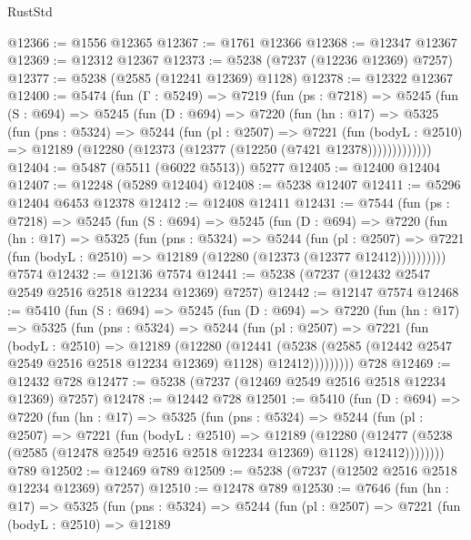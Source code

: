 \begin{lexlean}{RustStd}
\begin{coremodule}
@12366 := @1556 @12365
@12367 := @1761 @12366
@12368 := @12347 @12367
@12369 := @12312 @12367
@12373 := @5238 (@7237 (@12236 @12369) @7257)
@12377 := @5238 (@2585 (@12241 @12369) @1128)
@12378 := @12322 @12367
@12400 := @5474
    (fun (Γ : @5249) =>
    @7219
      (fun (ps : @7218) =>
      @5245
        (fun (S : @694) =>
        @5245
          (fun (D : @694) =>
          @7220
            (fun (hn : @17) =>
            @5325
              (fun (pns : @5324) =>
              @5244
                (fun (pl : @2507) =>
                @7221
                  (fun (bodyL : @2510) =>
                  @12189 (@12280 (@12373 (@12377 (@12250 (@7421 @12378)))))))))))))
@12404 := @5487 (@5511 (@6022 @5513)) @5277
@12405 := @12400 @12404
@12407 := @12248 (@5289 @12404)
@12408 := @5238 @12407
@12411 := @5296 @12404 @6453 @12378
@12412 := @12408 @12411
@12431 := @7544
    (fun (ps : @7218) =>
    @5245
      (fun (S : @694) =>
      @5245
        (fun (D : @694) =>
        @7220
          (fun (hn : @17) =>
          @5325
            (fun (pns : @5324) =>
            @5244
              (fun (pl : @2507) =>
              @7221 (fun (bodyL : @2510) => @12189 (@12280 (@12373 (@12377 @12412))))))))))
    @7574
@12432 := @12136 @7574
@12441 := @5238 (@7237 (@12432 @2547 @2549 @2516 @2518 @12234 @12369) @7257)
@12442 := @12147 @7574
@12468 := @5410
    (fun (S : @694) =>
    @5245
      (fun (D : @694) =>
      @7220
        (fun (hn : @17) =>
        @5325
          (fun (pns : @5324) =>
          @5244
            (fun (pl : @2507) =>
            @7221
              (fun (bodyL : @2510) =>
              @12189
                (@12280
                  (@12441
                    (@5238
                      (@2585 (@12442 @2547 @2549 @2516 @2518 @12234 @12369) @1128)
                      @12412)))))))))
    @728
@12469 := @12432 @728
@12477 := @5238 (@7237 (@12469 @2549 @2516 @2518 @12234 @12369) @7257)
@12478 := @12442 @728
@12501 := @5410
    (fun (D : @694) =>
    @7220
      (fun (hn : @17) =>
      @5325
        (fun (pns : @5324) =>
        @5244
          (fun (pl : @2507) =>
          @7221
            (fun (bodyL : @2510) =>
            @12189
              (@12280
                (@12477 (@5238 (@2585 (@12478 @2549 @2516 @2518 @12234 @12369) @1128) @12412))))))))
    @789
@12502 := @12469 @789
@12509 := @5238 (@7237 (@12502 @2516 @2518 @12234 @12369) @7257)
@12510 := @12478 @789
@12530 := @7646
    (fun (hn : @17) =>
    @5325
      (fun (pns : @5324) =>
      @5244
        (fun (pl : @2507) =>
        @7221
          (fun (bodyL : @2510) =>
          @12189

\end{coremodule}
\end{lexlean}
